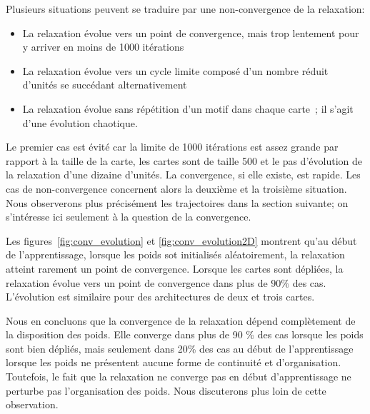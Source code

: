 \documentclass[../main]{subfiles}
\begin{document}
Plusieurs situations peuvent se traduire par une non-convergence de la relaxation:
\begin{itemize}
\item La relaxation évolue vers un point de convergence, mais trop lentement pour y arriver en moins de 1000 itérations
\item La relaxation évolue vers un cycle limite composé d'un nombre réduit d'unités se succédant alternativement
\item La relaxation évolue sans répétition d'un motif dans chaque carte~; il s'agit d'une évolution chaotique.
\end{itemize}

Le premier cas est évité car la limite de 1000 itérations est assez grande par rapport à la taille de la carte, les cartes sont de taille 500 et le pas d'évolution de la relaxation d'une dizaine d'unités. 
La convergence, si elle existe, est rapide. Les cas de non-convergence concernent alors la deuxième et la troisième situation. Nous observerons plus précisément les trajectoires dans la section suivante; on s'intéresse ici seulement à la question de la convergence.

Les figures~\ref{fig:conv_evolution} et \ref{fig:conv_evolution2D} montrent qu'au début de l'apprentissage, lorsque les poids sot initialisés aléatoirement, la relaxation atteint rarement un point de convergence. Lorsque les cartes sont dépliées, la relaxation évolue vers un point de convergence dans plus de $90 \%$ des cas. L'évolution est similaire pour des architectures de deux et trois cartes.

Nous en  concluons que la convergence de la relaxation dépend complètement de la disposition des poids. 
Elle converge dans plus de 90 \% des cas lorsque les poids sont bien dépliés, mais seulement dans 20\% des cas au début de l'apprentissage lorsque les poids ne présentent aucune forme de continuité et d'organisation.
Toutefois, le fait que la relaxation ne converge pas en début d'apprentissage ne perturbe pas l'organisation des poids. Nous discuterons plus loin de cette observation.
\end{document}
